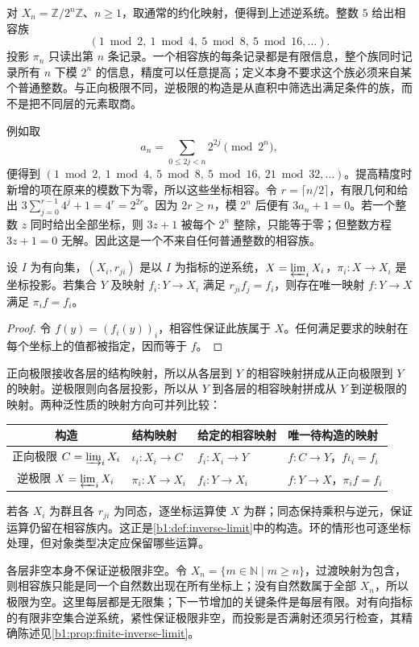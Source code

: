 对 \(X_n=\mathbb Z/2^n\mathbb Z\)、\(n\geq1\)，取通常的约化映射，便得到上述逆系统。整数 \(5\) 给出相容族
\[
	(1\bmod2,\ 1\bmod4,\ 5\bmod8,\ 5\bmod16,\ldots).
\]
投影 \(\pi_n\) 只读出第 \(n\) 条记录。一个相容族的每条记录都是有限信息，整个族同时记录所有 \(n\) 下模 \(2^n\) 的信息，精度可以任意提高；定义本身不要求这个族必须来自某个普通整数。与正向极限不同，逆极限的构造是从直积中筛选出满足条件的族，而不是把不同层的元素取商。

\ProseParagraphBreak
例如取
\[
	a_n=\sum_{0\leq2j<n}2^{2j}\pmod{2^n},
\]
便得到 \((1\bmod2,\ 1\bmod4,\ 5\bmod8,\ 5\bmod16,\ 21\bmod32,\ldots)\)。提高精度时新增的项在原来的模数下为零，所以这些坐标相容。令 \(r=\lceil n/2\rceil\)，有限几何和给出 \(3\sum_{j=0}^{r-1}4^j+1=4^r=2^{2r}\)。因为 \(2r\geq n\)，模 \(2^n\) 后便有 \(3a_n+1=0\)。若一个整数 \(z\) 同时给出全部坐标，则 \(3z+1\) 被每个 \(2^n\) 整除，只能等于零；但整数方程 \(3z+1=0\) 无解。因此这是一个不来自任何普通整数的相容族。

\begin{proposition}\label{b1:prop:inverse-limit-set-universal}
	设 \(I\) 为有向集，\((X_i,r_{ji})\) 是以 \(I\) 为指标的逆系统，\(X=\varprojlim_iX_i\)，\(\pi_i:X\rightarrow X_i\) 是坐标投影。若集合 \(Y\) 及映射 \(f_i:Y\rightarrow X_i\) 满足 \(r_{ji}f_j=f_i\)，则存在唯一映射 \(f:Y\rightarrow X\) 满足 \(\pi_i f=f_i\)。
\end{proposition}

\begin{proof}
	令 \(f(y)=(f_i(y))_i\)，相容性保证此族属于 \(X\)。任何满足要求的映射在每个坐标上的值都被指定，因而等于 \(f\)。
\end{proof}

正向极限接收各层的结构映射，所以从各层到 \(Y\) 的相容映射拼成从正向极限到 \(Y\) 的映射。逆极限则向各层投影，所以从 \(Y\) 到各层的相容映射拼成从 \(Y\) 到逆极限的映射。两种泛性质的映射方向可并列比较：
\begin{center}
	\small
	\begin{tabularx}{\linewidth}{@{}c>{\centering\arraybackslash}X>{\centering\arraybackslash}X>{\centering\arraybackslash}X@{}}
		\toprule
		构造 & 结构映射 & 给定的相容映射 & 唯一待构造的映射\\
		\midrule
		正向极限 \(C=\varinjlim_iX_i\) & \(\iota_i:X_i\to C\) & \(f_i:X_i\to Y\) & \(f:C\to Y\)，\(f\iota_i=f_i\)\\
		逆极限 \(X=\varprojlim_iX_i\) & \(\pi_i:X\to X_i\) & \(f_i:Y\to X_i\) & \(f:Y\to X\)，\(\pi_i f=f_i\)\\
		\bottomrule
	\end{tabularx}
\end{center}

若各 \(X_i\) 为群且各 \(r_{ji}\) 为同态，逐坐标运算使 \(X\) 为群；同态保持乘积与逆元，保证运算仍留在相容族内。这正是\cref{b1:def:inverse-limit}中的构造。环的情形也可逐坐标处理，但对象类型决定应保留哪些运算。

\ProseParagraphBreak
各层非空本身不保证逆极限非空。令 \(X_n=\{m\in\mathbb N\mid m\geq n\}\)，过渡映射为包含，则相容族只能是同一个自然数出现在所有坐标上；没有自然数属于全部 \(X_n\)，所以极限为空。这里每层都是无限集；下一节增加的关键条件是每层有限。对有向指标的有限非空集合逆系统，紧性保证极限非空，而投影是否满射还须另行检查，其精确陈述见\cref{b1:prop:finite-inverse-limit}。
